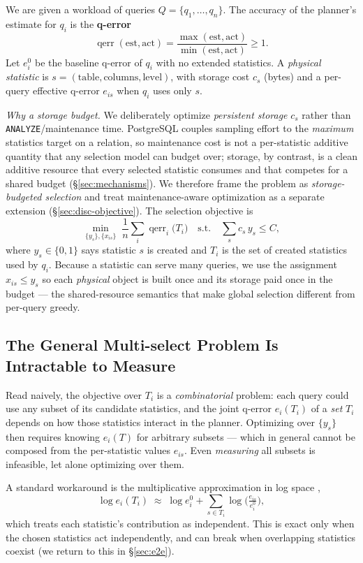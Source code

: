 \documentclass[sigconf, nonacm]{acmart}
\begin{document}
We are given a workload of queries $Q=\{q_1,\dots,q_n\}$. The accuracy of the
planner's estimate for $q_i$ is the \textbf{q-error}
\[
  \operatorname{qerr}(\text{est},\text{act})=\frac{\max(\text{est},\text{act})}
  {\min(\text{est},\text{act})}\ge 1.
\]
Let $e_i^0$ be the baseline q-error of $q_i$ with no extended statistics. A
\emph{physical statistic} is $s=(\text{table},\text{columns},\text{level})$,
with storage cost $c_s$ (bytes) and a per-query effective q-error $e_{is}$
when $q_i$ uses only $s$.

\emph{Why a storage budget.} We deliberately optimize \emph{persistent
storage} $c_s$ rather than \texttt{ANALYZE}/maintenance time. PostgreSQL couples
sampling effort to the \emph{maximum} statistics target on a relation, so
maintenance cost is not a per-statistic additive quantity that any selection
model can budget over; storage, by contrast, is a clean additive resource that
every selected statistic consumes and that competes for a shared budget
(\S\ref{sec:mechanisms}). We therefore frame the problem as \emph{storage-budgeted
selection} and treat maintenance-aware optimization as a separate extension
(\S\ref{sec:disc-objective}). The selection objective is
\[
  \min_{\{y_s\},\{x_{is}\}}\; \frac{1}{n}\sum_i \operatorname{qerr}_i\big(T_i\big)
  \quad\text{s.t.}\quad \sum_s c_s\,y_s \le C,
\]
where $y_s\in\{0,1\}$ says statistic $s$ is created and $T_i$ is the set of
created statistics used by $q_i$. Because a statistic can serve many queries,
we use the assignment $x_{is}\le y_s$ so each \emph{physical} object is built
once and its storage paid once in the budget --- the shared-resource semantics
that make global selection different from per-query greedy.

\subsection{The General Multi-select Problem Is Intractable to Measure}
\label{sec:multi}

Read naively, the objective over $T_i$ is a \emph{combinatorial} problem: each
query could use any subset of its candidate statistics, and the joint q-error
$e_i(T_i)$ of a \emph{set} $T_i$ depends on how those statistics interact in the
planner. Optimizing over $\{y_s\}$ then requires knowing $e_i(T)$ for arbitrary
subsets --- which in general cannot be composed from the per-statistic values
$e_{is}$. Even \emph{measuring} all subsets is infeasible, let alone optimizing
over them.

A standard workaround is the multiplicative approximation in log space
\cite{ioannidis2003history},
\[
  \log e_i(T_i)\;\approx\;\log e_i^0 + \sum_{s\in T_i}\log\!\Big(\tfrac{e_{is}}{e_i^0}\Big),
\]
which treats each statistic's contribution as independent. This is exact only
when the chosen statistics act independently, and can break when overlapping
statistics coexist (we return to this in \S\ref{sec:e2e}).
\end{document}
